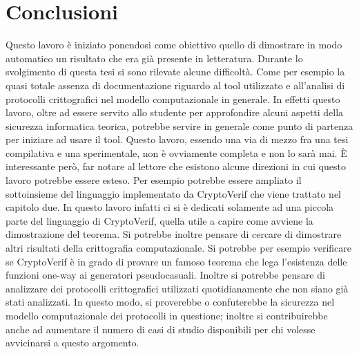 \documentclass[a4paper,openright,twoside,12pt]{report}
\begin{document}
\chapter{Conclusioni}
Questo lavoro \`e iniziato ponendosi come obiettivo quello di dimostrare in modo automatico un risultato che era gi\`a presente in
letteratura. Durante lo svolgimento di questa tesi si sono rilevate alcune difficolt\`a. Come per esempio la 
quasi totale assenza di documentazione riguardo al tool utilizzato e all'analisi di protocolli crittografici nel modello computazionale
in generale. In effetti questo lavoro, oltre ad essere servito allo studente per approfondire alcuni aspetti della sicurezza informatica
teorica, potrebbe servire in generale come punto di partenza per iniziare ad usare il tool.
Questo lavoro, essendo una via di mezzo fra una tesi compilativa e una sperimentale, non \`e ovviamente completa e non lo sar\`a mai.
\`E interessante per\`o, far notare al lettore che esistono alcune direzioni in cui questo lavoro potrebbe essere esteso.
Per esempio potrebbe essere ampliato il sottoinsieme del linguaggio implementato da CryptoVerif che viene trattato nel capitolo due.
In questo lavoro infatti ci si \`e dedicati solamente ad una piccola parte del linguaggio di CryptoVerif, quella utile a capire come avviene
la dimostrazione del teorema. 
Si potrebbe inoltre pensare di cercare di dimostrare altri risultati della crittografia computazionale. Si potrebbe per esempio verificare
se CryptoVerif \`e in grado di provare un famoso teorema che lega l'esistenza delle funzioni one-way ai generatori pseudocasuali. Inoltre si potrebbe pensare di analizzare
dei protocolli crittografici utilizzati quotidianamente che non siano gi\`a stati analizzati. In questo modo, si
proverebbe o confuterebbe la sicurezza nel modello computazionale dei protocolli in questione; inoltre si contribuirebbe anche ad aumentare il numero di casi di studio disponibili per chi
volesse avvicinarsi a questo argomento. 
\lhead[\fancyplain{}{\bfseries\thepage}]{\fancyplain{}{\bfseries\rightmark}}
	
		
\end{document}
